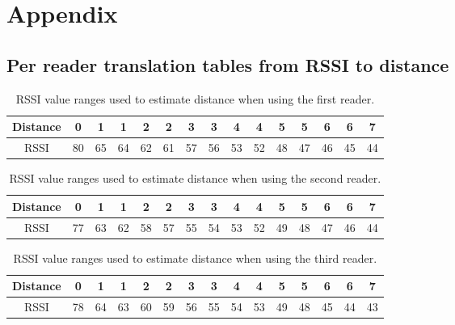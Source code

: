 \chapter{Appendix}
\label{ap:appendix}

\section{Per reader translation tables from RSSI to distance}
\label{sec:trans}

\begin{table}[h]
	\centering
	\begin{tabular}{ | c | c | c || c | c || c | c || c | c || c | c || c | c || c | c | }
		\hline
		Distance 	& 0  & 1  & 1  & 2  & 2  & 3  & 3  & 4  & 4  & 5  & 5  & 6  & 6  & 7  \\ \hline
		RSSI 		& 80 & 65 & 64 & 62 & 61 & 57 & 56 & 53 & 52 & 48 & 47 & 46 & 45 & 44  \\ \hline
	\end{tabular}
	\caption{RSSI value ranges used to estimate distance when using the first reader. }
	\label{tbl:trans1}
\end{table}

\begin{table}[h]
	\centering
	\begin{tabular}{ | c | c | c || c | c || c | c || c | c || c | c || c | c || c | c | }
		\hline
		Distance 	& 0  & 1  & 1  & 2  & 2  & 3  & 3  & 4  & 4  & 5  & 5  & 6  & 6  & 7  \\ \hline
		RSSI 		& 77 & 63 & 62 & 58 & 57 & 55 & 54 &53  & 52 & 49 & 48 & 47 & 46 & 44 \\ \hline
	\end{tabular}
	\caption{RSSI value ranges used to estimate distance when using the second reader. }
	\label{tbl:trans2}
\end{table}

\begin{table}[h]
	\centering
	\begin{tabular}{ | c | c | c || c | c || c | c || c | c || c | c || c | c || c | c | }
		\hline
		Distance 	& 0  & 1  & 1  & 2  & 2  & 3  & 3  & 4  & 4  & 5  & 5  & 6  & 6  & 7  \\ \hline
		RSSI 		& 78 & 64 & 63 & 60 & 59 & 56 & 55 & 54 & 53 & 49 & 48 & 45 & 44 & 43 \\ \hline
	\end{tabular}
	\caption{RSSI value ranges used to estimate distance when using the third reader. }
	\label{tbl:trans3}
\end{table}

